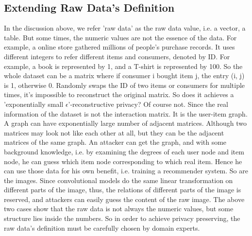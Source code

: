 \subsection{Extending Raw Data's Definition}
In the discussion above, we refer 'raw data' as the raw data value, i.e. a vector, a table. But some times, the numeric values are not the essence of the data. For example, a online store gathered millions of people's purchase records. It uses different integers to refer different items and consumers, denoted by ID. For example, a book is represented by 1, and a T-shirt is represented by 100. So the whole dataset can be a matrix where if consumer i bought item j, the entry (i, j) is 1, otherwise 0. Randomly swaps the ID of two items or consumers for multiple times, it's impossible to reconstruct the original matrix. So does it achieves a 'exponentially  small $\epsilon$'-reconstructive privacy? Of course not. Since the real information of the dataset is not the interaction matrix. It is the user-item graph. A graph can have exponentially large number of adjacent matrices. Although two matrices may look not like each other at all, but they can be the adjacent matrices of the same graph. An attacker can get the graph, and with some background knowledge, i.e. by examining the degrees of each user node and item node, he can guess which item node corresponding to which real item. Hence he can use those data for his own benefit, i.e. training a recommender system. So are the images. Since convolutional models do the same linear transformation on different parts of the image, thus, the relations of different parts of the image is reserved, and attackers can easily guess the content of the raw image.
The above two cases show that the raw data is not always the numeric values, but some structure lies inside the numbers. So in order to achieve privacy preserving, the raw data's definition must be carefully chosen by domain experts.